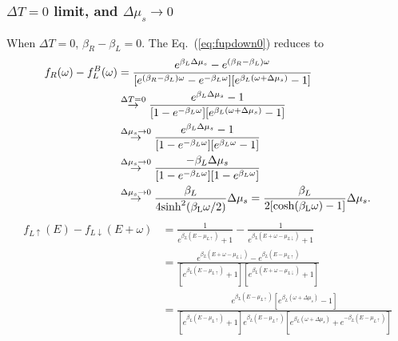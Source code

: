 \documentclass[aps,prb,superscriptaddress]{revtex4-2}
\begin{document}
\subsubsection{$\Delta T=0$ limit, and $\Delta\mu_s\to0$}
When $\Delta T = 0$, $\beta_{R} - \beta_{L} = 0$. The Eq.~(\ref{eq:fupdown0}) reduces to
\begin{equation}
\begin{split}
f_{R}(\omega)-f_{L}^{B}(\omega) & =\frac{e^{\beta_{L}\Delta\mu_{s}} - e^{(\beta_{R}-\beta_{L})\omega}}{[e^{(\beta_{R}-\beta_{L})\omega}-e^{-\beta_{L}\omega}][e^{\beta_{L}(\omega+\Delta\mu_{s})}-1]} \\
&\stackrel{\Delta T= 0}{\rightarrow} \frac{e^{\beta_{L}\Delta\mu_{s}} - 1}{ [1 - e^{-\beta_{L}\omega}][e^{\beta_{L}(\omega+\Delta\mu_{s})}-1]}\\
&\stackrel{\Delta \mu_s\to 0}{\rightarrow} \frac{e^{\beta_{L}\Delta\mu_{s}} - 1}{ [1 - e^{-\beta_{L}\omega}][e^{\beta_{L}\omega}-1]} \\
&\stackrel{\Delta \mu_s\to 0}{\rightarrow} \frac{-\beta_{L}\Delta\mu_{s}}{ [1 - e^{-\beta_{L}\omega}][1-e^{\beta_{L}\omega}]} \\
& \stackrel{\Delta \mu_s\to 0}{\rightarrow} \frac{\beta_{L}} {4\rm{sinh}^2(\beta_{L}\omega/2)} \Delta\mu_{s}= \frac{\beta_{L}} {2[\rm{cosh}(\beta_{L}\omega)-1]}\Delta\mu_{s}.
\end{split}
\end{equation}
\begin{equation}
\begin{split}
f_{L\uparrow}(E)-f_{L\downarrow}(E+\omega) &= \frac{1}{e^{\beta_{L}(E-\mu_{L\uparrow})}+1} - \frac{1}{e^{\beta_{L}(E+\omega-\mu_{L\downarrow})}+1} \\
&= \frac{e^{\beta_{L}(E+\omega-\mu_{L\downarrow})}- e^{\beta_{L}(E-\mu_{L\uparrow})}} {[e^{\beta_{L}(E-\mu_{L\uparrow})}+1] [e^{\beta_{L}(E+\omega-\mu_{L\downarrow})}+1]} \\
& = \frac{e^{\beta_L(E-\mu_{L\uparrow})} [e^{\beta_{L}(\omega+\Delta\mu_s)}- 1]} {[e^{\beta_{L}(E-\mu_{L\uparrow})}+1] e^{\beta_L(E-\mu_{L\uparrow})} [e^{\beta_{L}(\omega+\Delta\mu_s)}+e^{-\beta_L(E-\mu_{L\uparrow})}]}
\end{split}
\end{equation}
\end{document}
